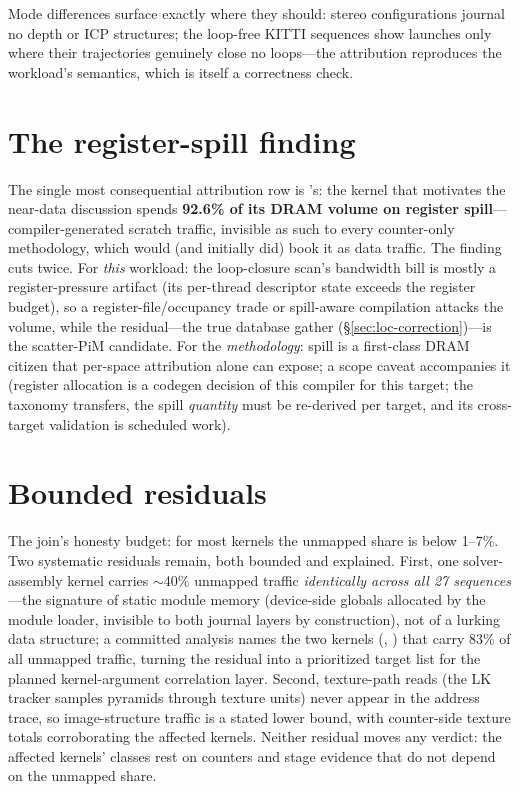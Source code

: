 Mode differences surface exactly where they should: stereo configurations
journal no depth or ICP structures; the loop-free KITTI sequences show
\stTrack{} launches only where their trajectories genuinely close no
loops---the attribution reproduces the workload's semantics, which is
itself a correctness check.

\section{The register-spill finding}
\label{sec:attr-spill}

The single most consequential attribution row is \stTrack{}'s: the kernel
that motivates the near-data discussion spends \textbf{92.6\% of its DRAM
volume on register spill}---compiler-generated scratch traffic, invisible
as such to every counter-only methodology, which would (and initially did)
book it as data traffic. The finding cuts twice. For \emph{this} workload:
the loop-closure scan's bandwidth bill is mostly a register-pressure
artifact (its per-thread descriptor state exceeds the register budget), so
a register-file/occupancy trade or spill-aware compilation attacks the
volume, while the residual---the true database gather
(\S\ref{sec:loc-correction})---is the scatter-PiM candidate. For the
\emph{methodology}: spill is a first-class DRAM citizen that per-space
attribution alone can expose; a scope caveat accompanies it (register
allocation is a codegen decision of this compiler for this target; the
taxonomy transfers, the spill \emph{quantity} must be re-derived per
target, and its cross-target validation is scheduled work).

\section{Bounded residuals}
\label{sec:attr-residuals}

The join's honesty budget: for most kernels the unmapped share is below
1--7\%. Two systematic residuals remain, both bounded and explained. First,
one solver-assembly kernel carries $\sim$40\% unmapped traffic
\emph{identically across all 27 sequences}---the signature of static module
memory (device-side globals allocated by the module loader, invisible to
both journal layers by construction), not of a lurking data structure; a
committed analysis names the two kernels
(, ) that carry 83\% of all
unmapped traffic, turning the residual into a prioritized target list for
the planned kernel-argument correlation layer. Second, texture-path reads
(the LK tracker samples pyramids through texture units) never appear in the
address trace, so image-structure traffic is a stated lower bound, with
counter-side texture totals corroborating the affected kernels. Neither
residual moves any verdict: the affected kernels' classes rest on counters
and stage evidence that do not depend on the unmapped share.
